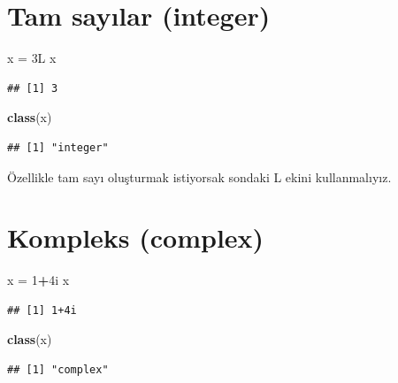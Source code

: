 \documentclass[]{book}
\newenvironment{Shaded}{\begin{snugshade}}{\end{snugshade}}
\newcommand{\DecValTok}[1]{\textcolor[rgb]{0.00,0.00,0.81}{#1}}
\newcommand{\KeywordTok}[1]{\textcolor[rgb]{0.13,0.29,0.53}{\textbf{#1}}}
\newcommand{\NormalTok}[1]{#1}
\newcommand{\OperatorTok}[1]{\textcolor[rgb]{0.81,0.36,0.00}{\textbf{#1}}}
\newcommand{\StringTok}[1]{\textcolor[rgb]{0.31,0.60,0.02}{#1}}
\begin{document}
\hypertarget{tam-saylar-integer}{%
\section{Tam sayılar (integer)}\label{tam-saylar-integer}}

\begin{Shaded}
\begin{Highlighting}[]
\NormalTok{x =}\StringTok{ }\NormalTok{3L}
\NormalTok{x}
\end{Highlighting}
\end{Shaded}

\begin{verbatim}
## [1] 3
\end{verbatim}

\begin{Shaded}
\begin{Highlighting}[]
\KeywordTok{class}\NormalTok{(x)}
\end{Highlighting}
\end{Shaded}

\begin{verbatim}
## [1] "integer"
\end{verbatim}

Özellikle tam sayı oluşturmak istiyorsak sondaki L ekini kullanmalıyız.

\hypertarget{kompleks-complex}{%
\section{Kompleks (complex)}\label{kompleks-complex}}

\begin{Shaded}
\begin{Highlighting}[]
\NormalTok{x =}\StringTok{ }\DecValTok{1}\OperatorTok{+}\NormalTok{4i}
\NormalTok{x}
\end{Highlighting}
\end{Shaded}

\begin{verbatim}
## [1] 1+4i
\end{verbatim}

\begin{Shaded}
\begin{Highlighting}[]
\KeywordTok{class}\NormalTok{(x)}
\end{Highlighting}
\end{Shaded}

\begin{verbatim}
## [1] "complex"
\end{verbatim}
\end{document}
